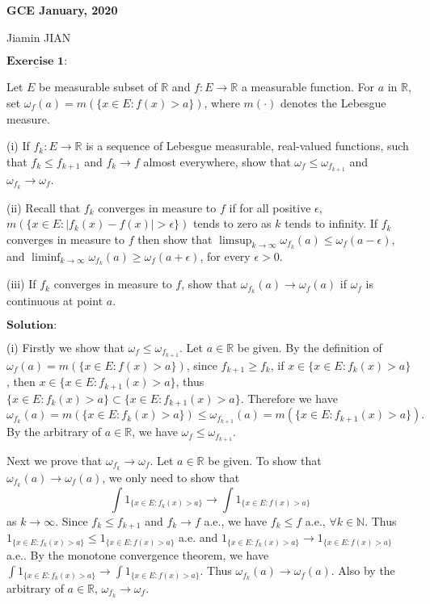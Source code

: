 \documentclass[12pt,a4paper]{ctexart}
\begin{document}
\begin{center}
\textbf{ GCE January, 2020}
\vspace{8pt}

Jiamin JIAN
\end{center}

\vspace{12pt}

$\underline{\textbf{Exercise 1:}}$

Let $E$ be measurable subset of $\mathbb R$ and $f: E \to \mathbb R$ a measurable function. For $a$ in $\mathbb R$, set $\omega_{f}(a) = m(\{x \in E: f(x) > a\})$, where $m(\cdot)$ denotes the Lebesgue measure.

(i) If $f_k: E \to \mathbb R$ is a sequence of Lebesgue measurable, real-valued functions, such that $f_k \leq f_{k+1}$ and $f_k \to f$ almost everywhere, show that $\omega_f \leq \omega_{f_{k+1}}$ and $\omega_{f_k} \to \omega_{f}$. 

(ii) Recall that $f_k$ converges in measure to $f$ if for all positive $\epsilon$, $m(\{x \in E: |f_k(x) - f(x)| > \epsilon \})$ tends to zero as $k$ tends to infinity. If $f_k$ converges in measure to $f$ then show that $\limsup_{k \to \infty} \omega_{f_k}(a) \leq \omega_{f}(a -\epsilon)$, and $\liminf_{k \to \infty} \omega_{f_{k}}(a) \geq \omega_{f}(a + \epsilon)$, for every $\epsilon > 0$.

(iii) If $f_k$ converges in measure to $f$, show that $\omega_{f_k}(a) \to \omega_f(a)$ if $\omega_f$ is continuous at point $a$.

\vspace{8pt}
$\textbf{Solution:}$

(i) Firstly we show that $\omega_f \leq \omega_{f_{k+1}}$. Let $a \in \mathbb R$ be given. By the definition of $\omega_{f}(a) = m(\{x \in E: f(x) > a\})$, since $f_{k+1} \geq f_k$, if $x \in \{x \in E: f_k(x) > a\}$, then $x \in \{x \in E: f_{k+1}(x) > a\}$, thus $\{x \in E: f_k(x) > a\} \subset \{x \in E: f_{k+1}(x) > a\}$. Therefore we have
$$\omega_{f_{k}}(a) = m(\{x \in E: f_k(x) > a\}) \leq \omega_{f_{k+1}}(a) = m(\{x \in E: f_{k+1}(x) > a\}).$$
By the arbitrary of $a \in \mathbb R$, we have $\omega_f \leq \omega_{f_{k+1}}$.

Next we prove that $\omega_{f_k} \to \omega_{f}$. Let $a \in \mathbb R$ be given. To show that $\omega_{f_k}(a) \to \omega_{f}(a)$, we only need to show that
$$\int 1_{\{x \in E: f_k(x) > a\}}  \to \int 1_{\{x \in E: f(x) > a\}}$$
as $k \to \infty$. Since $f_k \leq f_{k+1}$ and $f_k \to f$ a.e., we have $f_k \leq f$ a.e., $\forall k \in \mathbb N$. Thus $1_{\{x \in E: f_k(x) > a\}} \leq 1_{\{x \in E: f(x) > a\}}$ a.e. and $1_{\{x \in E: f_k(x) > a\}} \to 1_{\{x \in E: f(x) > a\}}$ a.e.. By the monotone convergence theorem, we have $\int 1_{\{x \in E: f_k(x) > a\}}  \to \int 1_{\{x \in E: f(x) > a\}}$. Thus $\omega_{f_k}(a) \to \omega_{f}(a)$. Also by the arbitrary of $a \in \mathbb R$, $\omega_{f_k} \to \omega_{f}$.
\end{document}
